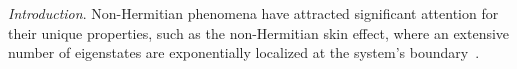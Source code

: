 \documentclass[longbibliography, aps, prx, amsmath, amssymb, amsfonts, twocolumn,superscriptaddress, footinbib]{revtex4-1}
\begin{document}
	
	\maketitle
	
	\textit{Introduction}. 
	Non-Hermitian phenomena have attracted significant attention for their unique properties, such as the non-Hermitian skin effect, where an extensive number of eigenstates are exponentially localized at the system's boundary~\cite{RN1166,RN1168,gong2018topological,kawabata2019symmetry,RN1212,RN1214,RN1217,RN1160}. 
\end{document}
